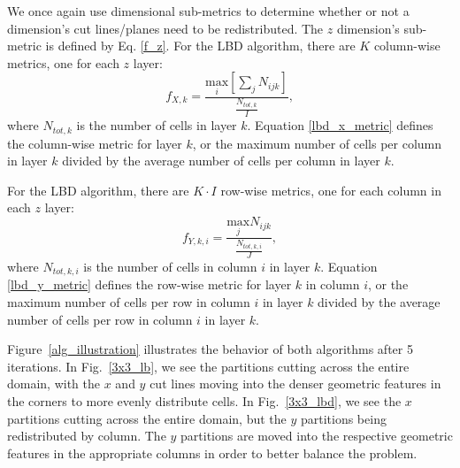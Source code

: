 \documentclass[times,final]{elsarticle}
\begin{document}
We once again use dimensional sub-metrics to determine whether or not a dimension's cut lines/planes need to be redistributed. The $z$ dimension's sub-metric is defined by Eq. \ref{f_z}. For the LBD algorithm, there are $K$ column-wise metrics, one for each $z$ layer:
\begin{equation}
f_{X,k} = \frac{ \underset{i}{\text{max}}[ \sum_{j} N_{ijk}]  }  {\frac{N_{tot,k}}{I}},
\label{lbd_x_metric}
\end{equation}
where $N_{tot,k}$ is the number of cells in layer $k$.
Equation \ref{lbd_x_metric} defines the column-wise metric for layer $k$, or the maximum number of cells per column in layer $k$ divided by the average number of cells per column in layer $k$.

For the LBD algorithm, there are $K\cdot I$ row-wise metrics, one for each column in each $z$ layer:
\begin{equation}
f_{Y,k,i} = \frac{\underset{j}{\text{max}} N_{ijk} } {\frac{N_{tot,k,i}}{J}},
\label{lbd_y_metric}
\end{equation}
where $N_{tot,k,i}$ is the number of cells in column $i$ in layer $k$.
Equation \ref{lbd_y_metric} defines the row-wise metric for layer $k$ in column $i$, or the maximum number of cells per row in column $i$ in layer $k$ divided by the average number of cells per row in column $i$ in layer $k$.

%
%
%
%

Figure~\ref{alg_illustration} illustrates the behavior of both algorithms after 5 iterations. In Fig.~\ref{3x3_lb}, we see the partitions cutting across the entire domain, with the $x$ and $y$ cut lines moving into the denser geometric features in the corners to more evenly distribute cells. In Fig.~\ref{3x3_lbd}, we see the $x$ partitions cutting across the entire domain, but the $y$ partitions being redistributed by column. The $y$ partitions are moved into the respective geometric features in the appropriate columns in order to better balance the problem.
\end{document}
